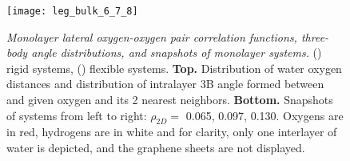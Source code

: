 \documentclass[12pt]{article}
\begin{document}

\setlength{\fboxsep}{0.75pt}%
\setlength{\fboxrule}{1.2pt}%

\begin{figure}[ht!]
	\centering
	\texttt{[image: leg\_bulk\_6\_7\_8]}\\
	\caption{\textit{Monolayer lateral oxygen-oxygen pair correlation functions, three-body angle distributions, and snapshots of monolayer systems.} (\protect{}) rigid systems, (\protect{}) flexible systems. \textbf{Top.} Distribution of water oxygen distances and distribution of intralayer 3B angle formed between and given oxygen and its 2 nearest neighbors. \textbf{Bottom.} Snapshots of systems from left to right: \(\rho_{2D}=\) 0.065, 0.097, 0.130. Oxygens are in red, hydrogens are in white and for clarity, only one interlayer of water is depicted, and the graphene sheets are not displayed.}
	\label{fig:struct_6_7_8}
\end{figure}
\end{document}
